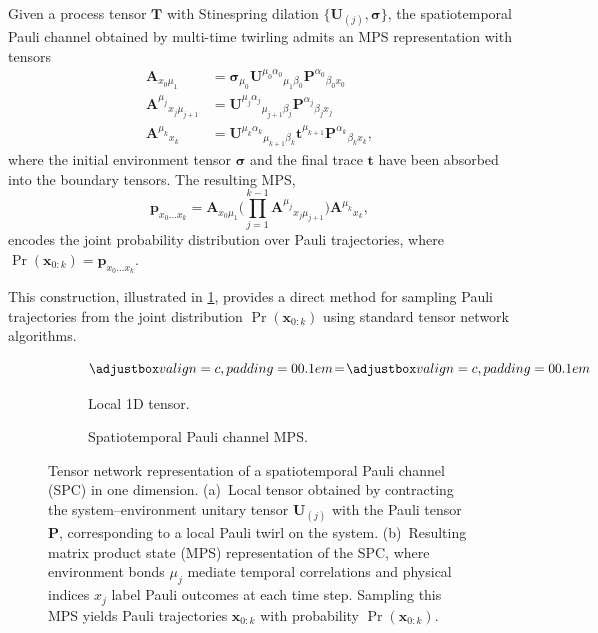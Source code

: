 \begin{definition}
  Given a process tensor $\mathbf T$ with Stinespring dilation $\{\mathbf U_{(j)}, \pmb\sigma\}$, the spatiotemporal Pauli channel obtained by multi-time twirling admits an MPS representation with tensors
  \begin{equation}
  \begin{aligned}
    \mathbf{A}_{x_0\mu_{1}} 
    &= \pmb{\sigma}_{\mu_0}\mathbf{U}^{\mu_0\alpha_0}{}_{\mu_{1}\beta_0} \mathbf{P}^{\alpha_0}{}_{\beta_0 x_0} \\
    \mathbf{A}^{\mu_j}{}_{x_j\mu_{j+1}} 
    &= \mathbf{U}^{\mu_j\alpha_j}{}_{\mu_{j+1}\beta_j} \mathbf{P}^{\alpha_j}{}_{\beta_j x_j} \\
    \mathbf{A}^{\mu_k}{}_{x_k} 
    &= \mathbf{U}^{\mu_k\alpha_k}{}_{\mu_{k+1}\beta_k}\mathbf{t}^{\mu_{k+1}}
    \mathbf{P}^{\alpha_k}{}_{\beta_k x_k},
  \end{aligned}
  \end{equation}
  where the initial environment tensor \(\pmb{\sigma}\) and the final trace \(\mathbf{t}\) have been absorbed into the boundary tensors. The resulting MPS,
  \begin{equation}
    \mathbf{p}_{x_0\dots x_k} =
    \mathbf{A}_{x_0\mu_1}
    \Bigg(\prod_{j=1}^{k-1} 
    \mathbf{A}^{\mu_j}{}_{x_j\mu_{j+1} }\Bigg)
    \mathbf{A}^{\mu_k}{}_{x_k},
  \end{equation}
  encodes the joint probability distribution over Pauli trajectories, where \(\Pr(\mathbf{x}_{0:k}) = \mathbf{p}_{x_0\dots x_k}\).
\end{definition}
This construction, illustrated in \cref{fig:spc-mps}, provides a direct method for sampling Pauli trajectories from the joint distribution \(\Pr(\mathbf{x}_{0:k})\) using standard tensor network algorithms.
\begin{figure}
    \centering
    \begin{subfigure}{0.49\textwidth}
      \centering
      \[
      \valignbox{} 
      \!=\!
      \valignbox{}
      \]
      \caption{Local 1D tensor.}
    \end{subfigure}
    \begin{subfigure}{0.50\textwidth}
      \centering
      
      \vspace{8mm}
      \caption{Spatiotemporal Pauli channel MPS.}
    \end{subfigure}
    \caption{Tensor network representation of a spatiotemporal Pauli channel (SPC) in one dimension. (a)~Local tensor obtained by contracting the system–environment unitary tensor \(\mathbf{U}_{(j)}\) with the Pauli tensor \(\mathbf{P}\), corresponding to a local Pauli twirl on the system. (b)~Resulting matrix product state (MPS) representation of the SPC, where environment bonds \(\mu_j\) mediate temporal correlations and physical indices \(x_j\) label Pauli outcomes at each time step. Sampling this MPS yields Pauli trajectories \(\mathbf{x}_{0:k}\) with probability \(\Pr(\mathbf{x}_{0:k})\).
}
    \label{fig:spc-mps}
\end{figure}
